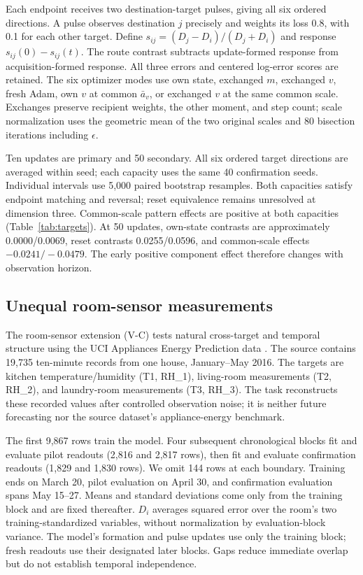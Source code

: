 Each endpoint receives two destination-target pulses, giving all six ordered directions. A pulse observes destination $j$ precisely and weights its loss 0.8, with 0.1 for each other target. Define $s_{ij}=(D_j-D_i)/(D_j+D_i)$ and response $s_{ij}(0)-s_{ij}(t)$. The route contrast subtracts update-formed response from acquisition-formed response. All three errors and centered log-error scores are retained. The six optimizer modes use own state, exchanged $m$, exchanged $v$, fresh Adam, own $v$ at common $\bar a_v$, or exchanged $v$ at the same common scale. Exchanges preserve recipient weights, the other moment, and step count; scale normalization uses the geometric mean of the two original scales and 80 bisection iterations including $\epsilon$.

Ten updates are primary and 50 secondary. All six ordered target directions are averaged within seed; each capacity uses the same 40 confirmation seeds. Individual intervals use 5,000 paired bootstrap resamples. Both capacities satisfy endpoint matching and reversal; reset equivalence remains unresolved at dimension three. Common-scale pattern effects are positive at both capacities (Table~\ref{tab:targets}). At 50 updates, own-state contrasts are approximately 0.0000/0.0069, reset contrasts 0.0255/0.0596, and common-scale effects $-0.0241/-0.0479$. The early positive component effect therefore changes with observation horizon.

\subsection{Unequal room-sensor measurements}
\label{app:natural}
The room-sensor extension (V-C) tests natural cross-target and temporal structure using the UCI Appliances Energy Prediction data \citep{candanedo2017data,candanedo2017dataset}. The source contains 19,735 ten-minute records from one house, January--May 2016. The targets are kitchen temperature/humidity (T1, RH\_1), living-room measurements (T2, RH\_2), and laundry-room measurements (T3, RH\_3). The task reconstructs these recorded values after controlled observation noise; it is neither future forecasting nor the source dataset's appliance-energy benchmark.

The first 9,867 rows train the model. Four subsequent chronological blocks fit and evaluate pilot readouts (2,816 and 2,817 rows), then fit and evaluate confirmation readouts (1,829 and 1,830 rows). We omit 144 rows at each boundary. Training ends on March 20, pilot evaluation on April 30, and confirmation evaluation spans May 15--27. Means and standard deviations come only from the training block and are fixed thereafter. $D_i$ averages squared error over the room's two training-standardized variables, without normalization by evaluation-block variance. The model's formation and pulse updates use only the training block; fresh readouts use their designated later blocks. Gaps reduce immediate overlap but do not establish temporal independence.

